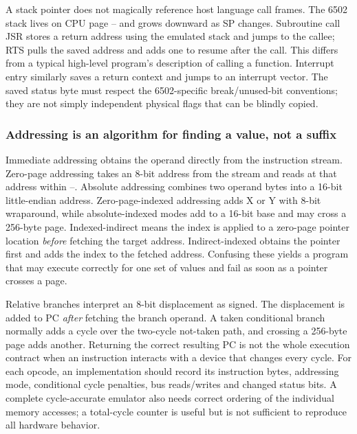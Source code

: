 A stack pointer does not magically reference host language call frames. The 6502 stack lives on CPU page -- and grows downward as SP changes. Subroutine call JSR stores a return address using the emulated stack and jumps to the callee; RTS pulls the saved address and adds one to resume after the call. This differs from a typical high-level program's description of calling a function. Interrupt entry similarly saves a return context and jumps to an interrupt vector. The saved status byte must respect the 6502-specific break/unused-bit conventions; they are not simply independent physical flags that can be blindly copied.

\subsubsection{Addressing is an algorithm for finding a value, not a suffix}\label{06-engine-ii-ch042-addressing-is-an-algorithm-for-finding-a-value-not-a-suffix}

\hypertarget{06-engine-ii-ch042-addressing-is-an-algorithm-for-finding-a-value-not-a-suffix}{}

Immediate addressing obtains the operand directly from the instruction stream. Zero-page addressing takes an 8-bit address from the stream and reads at that address within --. Absolute addressing combines two operand bytes into a 16-bit little-endian address. Zero-page-indexed addressing adds X or Y with 8-bit wraparound, while absolute-indexed modes add to a 16-bit base and may cross a 256-byte page. Indexed-indirect means the index is applied to a zero-page pointer location \emph{before} fetching the target address. Indirect-indexed obtains the pointer first and adds the index to the fetched address. Confusing these yields a program that may execute correctly for one set of values and fail as soon as a pointer crosses a page.

Relative branches interpret an 8-bit displacement as signed. The displacement is added to PC \emph{after} fetching the branch operand. A taken conditional branch normally adds a cycle over the two-cycle not-taken path, and crossing a 256-byte page adds another. Returning the correct resulting PC is not the whole execution contract when an instruction interacts with a device that changes every cycle. For each opcode, an implementation should record its instruction bytes, addressing mode, conditional cycle penalties, bus reads/writes and changed status bits. A complete cycle-accurate emulator also needs correct ordering of the individual memory accesses; a total-cycle counter is useful but is not sufficient to reproduce all hardware behavior.


